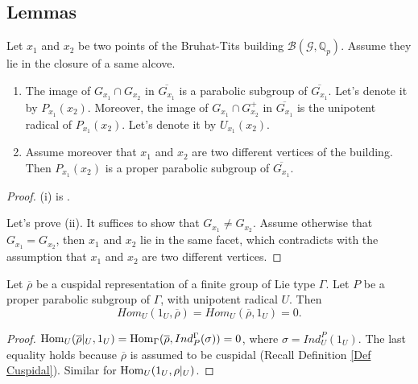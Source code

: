 	\subsection{Lemmas}
	
	\begin{lemma}\label{Lem Passage to Residue Field}
		Let $x_1$ and $x_2$ be two points of the Bruhat-Tits building $\mathcal{B}(\mathcal{G}, \mathbb{Q}_p)$. Assume they lie in the closure of a same alcove.
		\begin{enumerate}
			\item[(i)]   The image of $G_{x_1} \cap G_{x_2}$ in $\overline{G_{x_1}}$ is a parabolic subgroup of $\overline{G_{x_1}}$. Let's denote it by $P_{x_1}(x_2)$. Moreover, the image of $G_{x_1} \cap G_{x_2}^+$ in $\overline{G_{x_1}}$ is the unipotent radical of $P_{x_1}(x_2)$. Let's denote it by $U_{x_1}(x_2)$.
			\item[(ii)] 	Assume moreover that $x_1$ and $x_2$ are two different vertices of the building. Then $P_{x_1}(x_2)$ is a proper parabolic subgroup of $\overline{G_{x_1}}$.
		\end{enumerate}
	\end{lemma}
	
	\begin{proof}
		(i) is \cite[II.5.1.(k)]{vigneras1996representations}.
		
		Let's prove (ii). It suffices to show that $G_{x_1} \neq G_{x_2}$. Assume otherwise that $G_{x_1}=G_{x_2}$, then $x_1$ and $x_2$ lie in the same facet, which contradicts with the assumption that $x_1$ and $x_2$ are two different vertices.
	\end{proof}
	
	\begin{lemma}\label{Lem Hom_U(1_U, cusp)}
		Let $\overline{\rho}$ be a cuspidal representation of a finite group of Lie type $\Gamma$. Let $P$ be a proper parabolic subgroup of $\Gamma$, with unipotent radical $U$. Then
		$$Hom_U(1_U, \overline{\rho})=Hom_U(\overline{\rho}, 1_U)=0.$$
	\end{lemma}
	
	\begin{proof}
		$\operatorname{\operatorname{Hom}}_U(\overline{\rho}|_U, 1_U)=\operatorname{\operatorname{Hom}}_{\Gamma}(\overline{\rho}, Ind_P^{\Gamma}(\sigma))=0$, where $\sigma=Ind_U^P(1_U)$. The last equality holds because $\overline{\rho}$ is assumed to be cuspidal (Recall Definition \ref{Def Cuspidal}). Similar for $\operatorname{\operatorname{Hom}}_U(1_U, \rho|_U)$.
	\end{proof}
	
	
	
